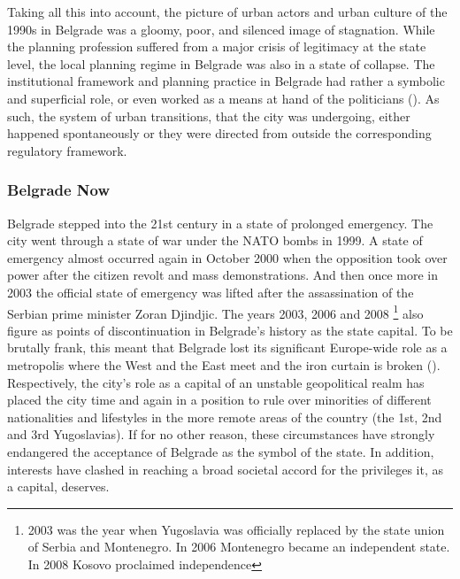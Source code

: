 \documentclass[11pt]{report}
\begin{document}
Taking all this into account, the picture of urban actors and urban culture of the 1990s in Belgrade was a gloomy, poor, and silenced image of stagnation. While the planning profession suffered from a major crisis of legitimacy at the state level, the local planning regime in Belgrade was also in a state of collapse. The institutional framework and planning practice in Belgrade had rather a symbolic and superficial role, or even worked as a means at hand of the politicians (\href{Vujosevic}{\citealt{vujosevic_planning_2006}}). As such, the system of urban transitions, that the city was undergoing, either happened spontaneously or they were directed from outside the corresponding regulatory framework.

\subsubsection{Belgrade Now}
Belgrade stepped into the 21st century in a state of prolonged emergency. The city went through a state of war under the NATO bombs in 1999. A state of emergency almost occurred again in October 2000 when the opposition took over power after the citizen revolt and mass demonstrations. And then once more in 2003 the official state of emergency was lifted after the assassination of the Serbian prime minister Zoran Djindjic. The years 2003, 2006 and 2008
\footnote{2003 was the year when Yugoslavia was officially replaced by the state union of Serbia and Montenegro. In 2006 Montenegro became an independent state. In 2008 Kosovo proclaimed independence}
also figure as points of discontinuation in Belgrade’s history as the state capital. To be brutally frank, this meant that Belgrade lost its significant Europe-wide role as a metropolis where the West and the East meet and the iron curtain is broken  (\href{Grozdanic}{\citealt{grozdanic_belgrade_2008}}).
\\

Respectively, the city’s role as a capital of an unstable geopolitical realm has placed the city time and again in a position to rule over minorities of different nationalities and lifestyles in the more remote areas of the country (the 1st, 2nd and 3rd Yugoslavias). If for no other reason, these circumstances have strongly endangered the acceptance of Belgrade as the symbol of the state. In addition, interests have clashed in reaching a broad societal accord for the privileges it, as a capital, deserves.
\\
\end{document}
